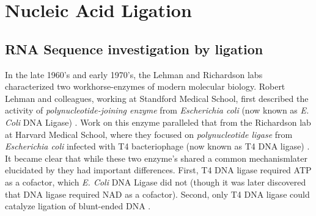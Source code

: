 
\section{Nucleic Acid Ligation}
\subsection{RNA Sequence investigation by ligation}\label{sec:Ligation}

In the late 1960's and early 1970's, the Lehman and Richardson labs characterized two workhorse-enzymes of modern molecular biology. Robert Lehman and colleagues, working at Standford Medical School, first described the activity of \textit{polynucleotide-joining enzyme} from \textit{Escherichia coli} (now known as \textit{E. Coli} DNA Ligase) \citep{Olivera1967b}. Work on this enzyme paralleled that from the Richardson lab at Harvard Medical School, where they focused on \textit{polynucleotide ligase} from \textit{Escherichia coli} infected with T4 bacteriophage (now known as T4 DNA ligase) \citep{Weiss1967a}. It became clear that while these two enzyme's shared a common mechanism\textemdash later elucidated by \citep{Modrich1973a}\textemdash they had important differences. First, T4 DNA ligase required ATP as a cofactor, which \textit{E. Coli} DNA Ligase did not (though it was later discovered that DNA ligase required NAD as a cofactor). Second, only T4 DNA ligase could catalyze ligation of blunt-ended DNA \citep{Tabor1987a}.


